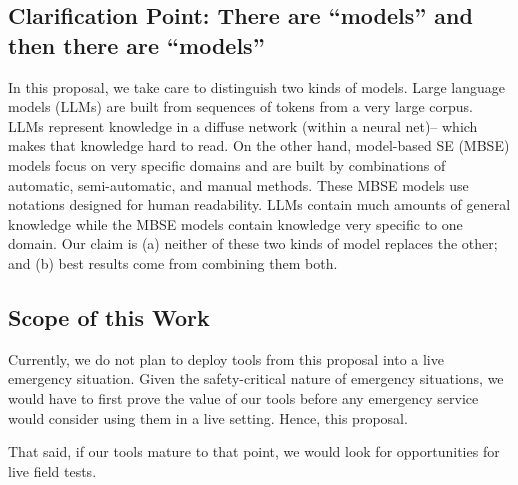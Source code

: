 \documentclass[twoside]{NSF}
\begin{document}
\begin{nsfdescription}
  \subsection{Clarification Point: There are ``models'' and then there are ``models''}

In this proposal, we take care to distinguish two kinds of models.
  Large language models  (LLMs) are built    from sequences
of tokens from  a very large corpus. 
LLMs represent knowledge in a diffuse network  (within a neural net)-- which makes that knowledge hard to read.
On the other hand, model-based SE (MBSE) models focus on very specific domains
and are built by combinations of automatic, 
semi-automatic, and manual methods. These  MBSE models 
 use notations designed  for human readability. 
  LLMs contain much amounts of general knowledge while the MBSE models contain knowledge very specific to one domain.
Our claim is  (a) neither of these two kinds of model    replaces the other; and (b) best results
come from combining them both.  

\subsection{Scope of this Work}

Currently, we do not plan to deploy tools from this proposal into a live emergency situation. Given the safety-critical nature of emergency situations, we would have to first prove the value of our tools before any emergency service would consider using them in a live setting. Hence, this proposal.

That said, if our tools mature to that point, we would look for opportunities for live field tests.



 
 






\end{nsfdescription}
\end{document}
